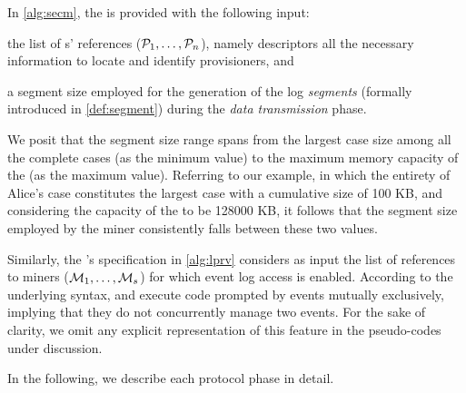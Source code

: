 \begin{newj}
In \cref{alg:secm}, the  is provided with the following input:
\begin{inparadesc}
    \item the list of s' references ($\mathcal{P}_1, \ldots, \mathcal{P}_n$), namely descriptors all the necessary information to locate and identify provisioners, and 
    \item a segment size {\SegSize} employed for the generation of the log \emph{segments} (formally introduced in \cref{def:segment}) during the \textit{data transmission} phase. %
\end{inparadesc}
We posit that the segment size range spans from the largest case size among all the complete cases (as the minimum value) to the maximum memory capacity of the  (as the maximum value). Referring to our example, in which the entirety of Alice's case constitutes the largest case with a cumulative size of 100 KB, and considering the capacity of the  to be 128000 KB, it follows that the segment size employed by the miner consistently falls between these two values.

Similarly, the 's specification in \cref{alg:lprv} considers as input the list of references to miners ($\mathcal{M}_1, \ldots, \mathcal{M}_s$) for which event log access is enabled. According to the underlying syntax, {\SecM} and {\LPrv} execute code prompted by events mutually exclusively, implying that they do not concurrently manage two events. For the sake of clarity, we omit any explicit representation of this feature in the pseudo-codes under discussion.
\end{newj}

In the following, we describe each protocol phase in detail.

